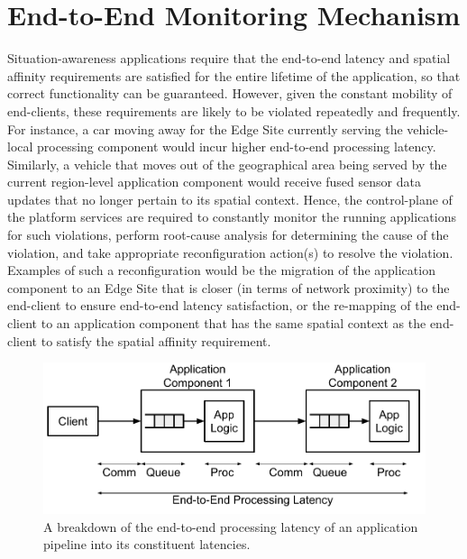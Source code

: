 \section{End-to-End Monitoring Mechanism}
Situation-awareness applications require that the end-to-end latency and spatial affinity requirements are satisfied for the entire lifetime of the application, so that correct functionality can be guaranteed. However, given the constant mobility of end-clients, these requirements are likely to be violated repeatedly and frequently. For instance, a car moving away for the Edge Site currently serving the vehicle-local processing component would incur higher end-to-end processing latency. Similarly, a vehicle that moves out of the geographical area being served by the current region-level application component would receive fused sensor data updates that no longer pertain to its spatial context. Hence, the control-plane of the platform services are required to constantly monitor the running applications for such violations, perform root-cause analysis for determining the cause of the violation, and take appropriate reconfiguration action(s) to resolve the violation. Examples of such a reconfiguration would be the migration of the application component to an Edge Site that is closer (in terms of network proximity) to the end-client to ensure end-to-end latency satisfaction, or the re-mapping of the end-client to an application component that has the same spatial context as the end-client to satisfy the spatial affinity requirement.
\begin{figure}
\centering
\includegraphics[width=0.75\linewidth]{figures/mechanisms/monitoring/pipeline_latencies}
\caption{A breakdown of the end-to-end processing latency of an application pipeline into its constituent latencies.}
\label{fig:pipeline_latencies}
\end{figure}
